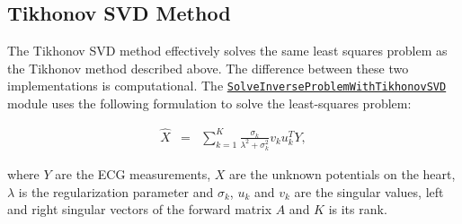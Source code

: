     
\subsection{Tikhonov SVD Method}

    The Tikhonov SVD method effectively solves the same least squares problem as the Tikhonov method described above.
    The difference between these two implementations is computational. 
    The \href{http://scirundocwiki.sci.utah.edu/SCIRunDocs/index.php5/CIBC:Documentation:SCIRun:Reference:BioPSE:SolveInverseProblemWithTikhonovSVD}{{\tt SolveInverseProblemWithTikhonovSVD}} module uses the following formulation to solve the least-squares problem:
    \begin{center}
    \begin{eqnarray}
        \hat{X}   &=& \sum_{k=1}^K \frac{\sigma_k}{\lambda^2 + \sigma_k^2} v_k u_k^T Y,
    \label{eq:inverseSec_TikhonovSolutions1}
    \end{eqnarray}
    \end{center} 
    where $Y$ are the ECG measurements, $X$ are the unknown potentials on the heart, $\lambda$ is the regularization parameter and $\sigma_k$, $u_k$ and $v_k$ are the singular values, left and right singular vectors of the forward matrix $A$ and $K$ is its rank.
    
